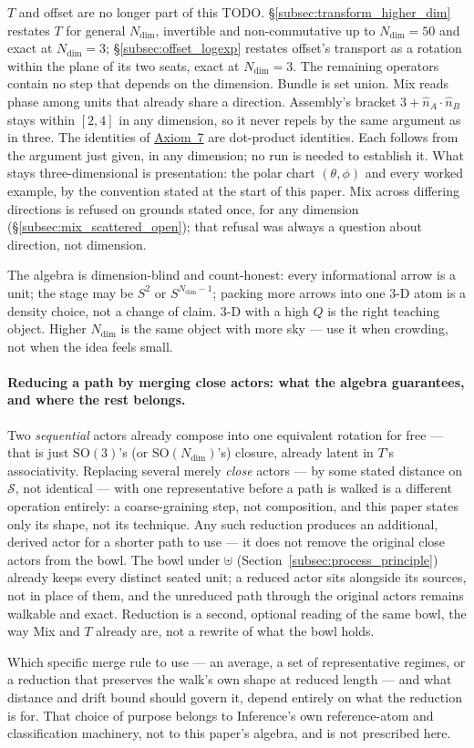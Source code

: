 \documentclass[12pt, a4paper]{article}
\begin{document}
$T$ and offset are no longer part of this TODO.
\S\ref{subsec:transform_higher_dim} restates $T$ for general
$N_{\mathrm{dim}}$, invertible and non-commutative up to
$N_{\mathrm{dim}}=50$ and exact at $N_{\mathrm{dim}}=3$;
\S\ref{subsec:offset_logexp} restates offset's transport as a
rotation within the plane of its two seats, exact at
$N_{\mathrm{dim}}=3$. The remaining operators contain no step that
depends on the dimension. Bundle is set union. Mix reads phase among
units that already share a direction. Assembly's bracket
$3+\hat n_A\cdot\hat n_B$ stays within $[2,4]$ in any dimension, so it
never repels by the same argument as in three. The identities of
\hyperref[subsec:axiom_v1_metrics]{Axiom~7} are dot-product
identities. Each follows from the argument just given, in any
dimension; no run is needed to establish it. What stays three-dimensional is presentation: the
polar chart $(\theta,\phi)$ and every worked example, by the
convention stated at the start of this paper. Mix across differing
directions is refused on grounds stated once, for any dimension
(\S\ref{subsec:mix_scattered_open}); that refusal was always a
question about direction, not dimension.

The algebra is dimension-blind and count-honest: every informational
arrow is a unit; the stage may be $S^2$ or $S^{N_{\mathrm{dim}}-1}$;
packing more arrows into one 3-D atom is a density choice, not a
change of claim. 3-D with a high $Q$ is the right teaching object.
Higher $N_{\mathrm{dim}}$ is the same object with more sky --- use it
when crowding, not when the idea feels small.


\paragraph{Reducing a path by merging close actors: what the algebra
guarantees, and where the rest belongs.} Two \emph{sequential} actors
already compose into one equivalent rotation for free --- that is
just $\mathrm{SO}(3)$'s (or $\mathrm{SO}(N_{\mathrm{dim}})$'s) closure,
already latent in $T$'s associativity. Replacing several merely
\emph{close} actors --- by some stated distance on $\mathcal{S}$, not
identical --- with one representative before a path is walked is a
different operation entirely: a coarse-graining step, not
composition, and this paper states only its shape, not its
technique. Any such reduction produces an additional, derived actor
for a shorter path to use --- it does not remove the original close
actors from the bowl. The bowl under $\uplus$
(Section~\ref{subsec:process_principle}) already keeps every
distinct seated unit; a reduced actor sits alongside its sources, not
in place of them, and the unreduced path through the original actors
remains walkable and exact. Reduction is a second, optional reading
of the same bowl, the way Mix and $T$ already are, not a rewrite of
what the bowl holds.

Which specific merge rule to use --- an average, a set of
representative regimes, or a reduction that preserves the walk's own
shape at reduced length --- and what distance and drift bound should
govern it, depend entirely on what the reduction is for. That choice
of purpose belongs to Inference's own reference-atom and
classification machinery, not to this paper's algebra, and is not
prescribed here.
\end{document}
